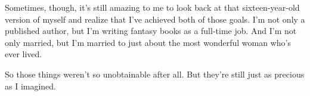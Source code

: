 Sometimes, though, it's still amazing to me to look back at that sixteen-year-old version of myself and realize that I've achieved both of those goals. I'm not only a published author, but I'm writing fantasy books as a  full-time job. And I'm not only married, but I'm married to just about the most wonderful woman who's ever lived.

So those things weren't so unobtainable after all. But they're still just as precious as I imagined.
